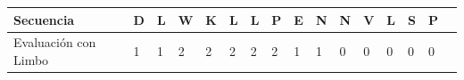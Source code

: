 \vspace{0.5cm}
\begin{center}
\begin{adjustbox}{width=\textwidth}
\begin{tabular}{llllllllllllllll} 
\hline      		
Secuencia & \textbf{D} & \textbf{L} & \textbf{W} & \textbf{K} & \textbf{L} & \textbf{L} & \textbf{P} & \textbf{E} & \textbf{N} & \textbf{N} & \textbf{V} & \textbf{L} & \textbf{S} & \textbf{P} \\ \hline
Evaluación con Limbo & 1 & 1 & 2 & 2 & 2 & 2 & 2 & 1 & 1 & 0 & 0 & 0 & 0 & 0 \\ \hline
\end{tabular}
\end{adjustbox}
\end{center}






